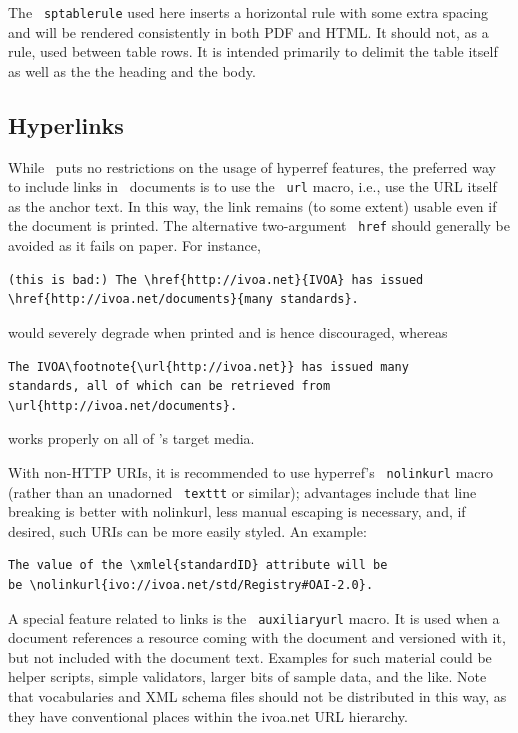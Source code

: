 \documentclass[11pt,a4paper]{ivoa}
\newcommand{\texword}[1]{\texttt{\color{texcolor} #1}}
\begin{document}
The \texword{sptablerule} used here inserts a horizontal rule with some
extra spacing and will be rendered consistently in both PDF and HTML.
It should not, as a rule, used between table rows. It is intended
primarily to delimit the table itself as well as the the heading and the
body.

\subsection{Hyperlinks}
\label{sect:links}

While \ivoatex\ puts no restrictions on the usage of hyperref features,
the preferred way to include links in \ivoatex\ documents is to use the
\texword{url} macro, i.e., use the URL itself as the anchor text.  In
this way, the link remains (to some extent) usable even if the document
is printed.  The alternative two-argument \texword{href} should
generally be avoided as it fails on paper.  For instance,
\begin{lstlisting}
(this is bad:) The \href{http://ivoa.net}{IVOA} has issued
\href{http://ivoa.net/documents}{many standards}.
\end{lstlisting}
would severely degrade when printed and is hence discouraged, whereas
\begin{lstlisting}
The IVOA\footnote{\url{http://ivoa.net}} has issued many
standards, all of which can be retrieved from
\url{http://ivoa.net/documents}.
\end{lstlisting}
works properly on all of \ivoatex's target media.

With non-HTTP URIs, it is recommended to use hyperref's
\texword{nolinkurl} macro (rather than an unadorned \texword{texttt} or
similar); advantages include that line breaking is better with
nolinkurl, less manual escaping is necessary, and, if desired,
such URIs can be more easily styled.  An example:

\begin{lstlisting}
The value of the \xmlel{standardID} attribute will be
be \nolinkurl{ivo://ivoa.net/std/Registry#OAI-2.0}.
\end{lstlisting}

A special feature related to links is the \texword{auxiliaryurl} macro.
It is used when a document references a resource coming with the
document and versioned with it, but not included with the document text.
Examples for such material could be helper scripts, simple validators,
larger bits of sample data, and the like.  Note that vocabularies and
XML schema files should not be distributed in this way, as they have
conventional places within the ivoa.net URL hierarchy.
\end{document}
